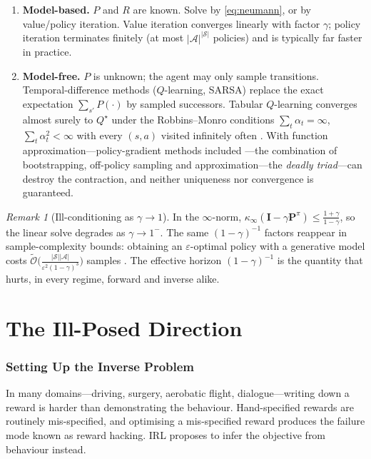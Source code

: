 \documentclass[11pt]{article}
\theoremstyle{plain}
\theoremstyle{definition}
\theoremstyle{remark}
\newtheorem{remark}[theorem]{Remark}
\renewcommand{\S}{\mathcal{S}}
\newcommand{\A}{\mathcal{A}}
\begin{document}
\begin{enumerate}
\item \textbf{Model-based.} $P$ and $R$ are known. Solve by
\eqref{eq:neumann}, or by value/policy iteration. Value iteration converges
linearly with factor $\gamma$; policy iteration terminates finitely (at
most $|\A|^{|\S|}$ policies) and is typically far faster in practice.
\item \textbf{Model-free.} $P$ is unknown; the agent may only sample
transitions. Temporal-difference methods ($Q$-learning, SARSA) replace the
exact expectation $\sum_{s'}P(\cdot)$ by sampled successors. Tabular
$Q$-learning converges almost surely to $Q^\star$ under the Robbins--Monro
conditions $\sum_t \alpha_t=\infty$, $\sum_t \alpha_t^2<\infty$ with every
$(s,a)$ visited infinitely often \cite{watkins1992,tsitsiklis1994}. With
function approximation---policy-gradient methods included
\cite{suttonbarto2018}---the combination of bootstrapping, off-policy
sampling and approximation---the \emph{deadly triad}---can destroy the
contraction, and neither uniqueness nor convergence is guaranteed.
\end{enumerate}

\begin{remark}[Ill-conditioning as $\gamma\to1$]
In the $\infty$-norm, $\kappa_\infty(\mathbf{I}-\gamma\mathbf{P}^\pi) \le
\frac{1+\gamma}{1-\gamma}$, so the linear solve degrades as $\gamma\to
1^-$. The same $(1-\gamma)^{-1}$ factors reappear in sample-complexity
bounds: obtaining an $\varepsilon$-optimal policy with a generative model
costs $\widetilde{\mathcal{O}}\big(\frac{|\S||\A|}{\varepsilon^2(1-\gamma)^3}\big)$
samples \cite{azar2013}. The effective horizon $(1-\gamma)^{-1}$ is the
quantity that hurts, in every regime, forward and inverse alike.
\end{remark}

\clearpage
\part{The Ill-Posed Direction}\label{part:illposed}

\section{Setting Up the Inverse Problem}

In many domains---driving, surgery, aerobatic flight, dialogue---writing
down a reward is harder than demonstrating the behaviour. Hand-specified
rewards are routinely mis-specified, and optimising a mis-specified reward
produces the failure mode known as reward hacking. IRL proposes to infer
the objective from behaviour instead.
\end{document}
